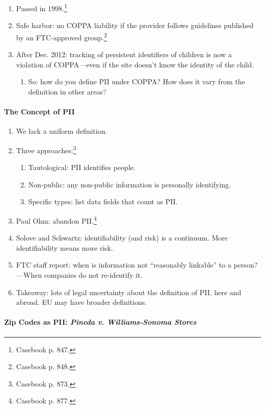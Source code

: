 \begin{enumerate}
    \item Passed in 1998.\footnote{Casebook p. 847.}
    \item Safe harbor: no COPPA liability if the provider follows guidelines 
    published by an FTC-approved group.\footnote{Casebook p. 848.}
    \item After Dec. 2012: tracking of persistent identifiers of children is now 
    a violation of COPPA---even if the site doesn't know the identity of the 
    child.
    \begin{enumerate}
        \item So: how do you define PII under COPPA? How does it vary from the 
        definition in other areas?
    \end{enumerate}
\end{enumerate}

\paragraph{The Concept of PII}

\begin{enumerate}
    \item We lack a uniform definition.
    \item Three approaches:\footnote{Casebook p. 873.}
    \begin{enumerate}
        \item Tautological: PII identifies people.
        \item Non-public: any non-public information is personally identifying.
        \item Specific types: list data fields that count as PII.
    \end{enumerate}
    \item Paul Ohm: abandon PII.\footnote{Casebook p. 877.}
    \item Solove and Schwartz: identifiability (and risk) is a continuum. More 
    identifiability means more risk.
    \item FTC staff report: when is information not ``reasonably linkable'' to a 
    person?---When companies do not re-identify it.
    \item Takeaway: lots of legal uncertainty about the definition of PII, here 
    and abroad. EU may have broader definitions.
\end{enumerate}

\paragraph{Zip Codes as PII: \emph{Pineda v. Williams-Sonoma Stores}}

